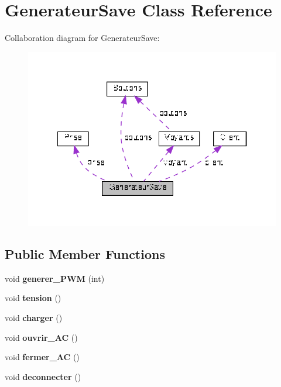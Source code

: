 \hypertarget{classGenerateurSave}{}\section{Generateur\+Save Class Reference}
\label{classGenerateurSave}


Collaboration diagram for Generateur\+Save\+:
\nopagebreak
\begin{figure}[H]
\begin{center}
\leavevmode
\includegraphics[width=334pt]{classGenerateurSave__coll__graph}
\end{center}
\end{figure}
\subsection*{Public Member Functions}
\begin{DoxyCompactItemize}
\item 
\mbox{\label{classGenerateurSave_ac55783f510639be4fc1f5758656535fb}} 
void {\bfseries generer\+\_\+\+P\+WM} (int)
\item 
\mbox{\label{classGenerateurSave_ad41bc9bda73b67d7aa1072fcbb1ca6f4}} 
void {\bfseries tension} ()
\item 
\mbox{\label{classGenerateurSave_a0da4a9688fd39f8de1c52bdaea262332}} 
void {\bfseries charger} ()
\item 
\mbox{\label{classGenerateurSave_ad5fcd732d01eb9c63777412900f4e7cb}} 
void {\bfseries ouvrir\+\_\+\+AC} ()
\item 
\mbox{\label{classGenerateurSave_a73df5cee4031fffe92fc35454602ca46}} 
void {\bfseries fermer\+\_\+\+AC} ()
\item 
\mbox{\label{classGenerateurSave_a0e4405ef904cab01fdc656c4afa56a9c}} 
void {\bfseries deconnecter} ()
\end{DoxyCompactItemize}
